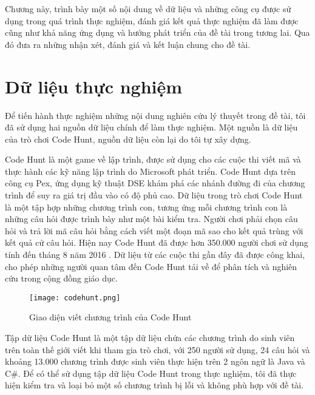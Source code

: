 
Chương này, trình bày một số nội dung về dữ liệu và những công cụ được
sử dụng trong quá trình thực nghiệm, đánh giá kết quả thực nghiệm đã 
làm được cũng như khả năng ứng dụng và hướng phát triển của đề tài 
trong tương lai. Qua đó đưa ra những nhận xét, đánh giá và kết luận 
chung cho đề tài.

\section{Dữ liệu thực nghiệm}

Để tiến hành thực nghiệm những nội dung nghiên cứu lý thuyết trong đề
tài, tôi đã sử dụng hai nguồn dữ liệu chính để làm thực nghiệm. Một
nguồn là dữ liệu của trò chơi Code Hunt, nguồn dữ liệu còn lại do tôi
tự xây dựng.

Code Hunt là một game về lập trình, được sử dụng cho
các cuộc thi viết mã và thực hành các kỹ năng lập trình do Microsoft
phát triển. Code Hunt dựa trên công cụ Pex, ứng dụng kỹ thuật DSE khám
phá các nhánh đường đi của chương trình để suy ra giá trị đầu vào có
độ phủ cao. Dữ liệu trong trò chơi Code Hunt là một tập hợp những
chương trình con, tương ứng mỗi chương trình con là những câu hỏi được
trình bày như một bài kiểm tra. Người chơi phải chọn câu hỏi và trả
lời mã câu hỏi bằng cách viết một đoạn mã sao cho kết quả trùng với
kết quả cử câu hỏi. Hiện nay Code Hunt đã được hơn 350.000 người chơi
sử dụng tính đến tháng 8 năm 2016 \cite{CodeHunt}. Dữ liệu từ các cuộc 
thi gần đây đã được công khai, cho phép những người quan tâm đến 
Code Hunt tải về để phân tích và nghiên cứu trong cộng đồng giáo dục.

\label{sec:data}
\begin{center}
  \begin{figure}[H]
    \begin{center}
      \texttt{[image: codehunt.png]}
    \end{center}
    \caption{Giao diện viết chương trình của Code Hunt}
    \label{codehunt2}
  \end{figure}
\end{center}

Tập dữ liệu Code Hunt là một tập dữ liệu chứa các chương trình do sinh 
viên trên toàn thế giới viết khi tham gia trò chơi, với 250 người sử dụng, 
24 câu hỏi và khoảng 13.000 chương trình được sinh viên thực hiện trên 2 
ngôn ngữ là Java và C\#. Để có thể sử dụng tập dữ liệu Code Hunt trong 
thực nghiệm, tôi đã thực hiện kiểm tra và loại bỏ một số chương trình bị 
lỗi và không phù hợp với đề tài.

